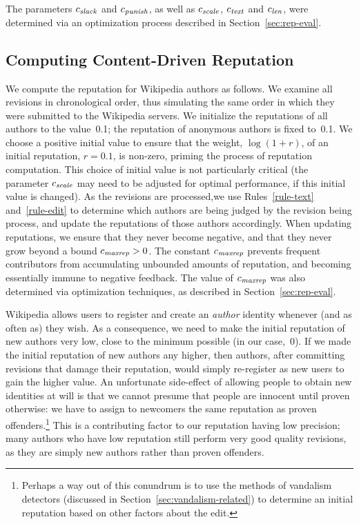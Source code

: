 The parameters ${c_{{\text{\textit{slack}}}}}$ and ${c_{{\text{\textit{punish}}}}}$, as well as ${c_{{\text{\textit{scale}}}}}$,
${c_{{\text{\textit{text}}}}}$ and ${c_{{\text{\textit{len}}}}}$, were determined via an optimization
process described in Section~\ref{sec:rep-eval}.

\subsection{Computing Content-Driven Reputation}

We compute the reputation for Wikipedia authors as follows.
We examine all revisions in chronological order, thus simulating the
same order in which they were submitted to the Wikipedia servers.
We initialize the reputations of all authors to the value~0.1;
the reputation of anonymous authors is fixed to~0.1.
We choose a positive initial value to ensure that the weight,
$\log (1+r)$, of an initial reputation, $r = 0.1$, is non-zero, priming
the process of reputation computation.
This choice of initial value is not particularly critical (the
parameter ${c_{{\text{\textit{scale}}}}}$ may need to be adjusted for optimal performance,
if this initial value is changed).
As the revisions are processed,we use Rules~\ref{rule-text}
and~\ref{rule-edit} to determine which authors are being
judged by the revision being process,
and update the reputations of those authors accordingly.
When updating reputations, we ensure that they never become negative,
and that they never grow beyond a bound ${c_{{\text{\textit{maxrep}}}}} > 0$.
The constant ${c_{{\text{\textit{maxrep}}}}}$ prevents frequent contributors from
accumulating unbounded amounts of reputation, and becoming essentially
immune to negative feedback.
The value of ${c_{{\text{\textit{maxrep}}}}}$ was also determined via
optimization techniques, as described in Section~\ref{sec:rep-eval}.

Wikipedia allows users to register and create an {\em author\/}
identity whenever (and as often as) they wish.
As a consequence, we need to make the initial reputation of new authors
very low, close to the minimum possible (in our case,~0).
If we made the initial reputation of new authors any higher,
then authors, after committing revisions that damage their reputation,
would simply re-register as new users to gain the higher value.
An unfortunate side-effect of allowing people to obtain new identities
at will is that we cannot presume that people are innocent until
proven otherwise: we have to assign to newcomers the same reputation
as proven offenders.\footnote{Perhaps a way out of this conundrum
is to use the methods of vandalism detectors (discussed
in Section~\ref{sec:vandalism-related}) to determine an
initial reputation based on other factors about the edit.}
This is a contributing factor to our reputation having low
precision; many authors who have low reputation still perform
very good quality revisions, as they are simply new authors rather than
proven offenders.


